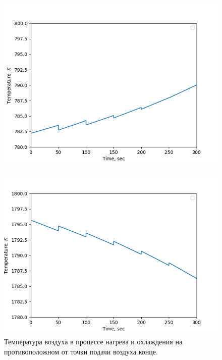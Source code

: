 \documentclass[a4paper,12pt]{article}
\begin{document}
\begin{figure}[ht]
    \centering
    \begin{minipage}[t]{0.49\textwidth}
        \centering
        \includegraphics[width=\textwidth]{img1}
        \label{fig:img1}
    \end{minipage}
    \hfill
    \begin{minipage}[t]{0.49\textwidth}
        \centering
        \includegraphics[width=\textwidth]{img2}
    \end{minipage}
    \caption {Температура воздуха в процессе нагрева и охлаждения на
    противоположном от точки подачи воздуха конце.}
\end{figure}
\end{document}
